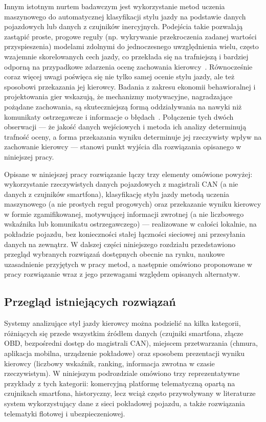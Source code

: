 Innym istotnym nurtem badawczym jest wykorzystanie metod uczenia maszynowego do
automatycznej klasyfikacji stylu jazdy na podstawie danych pojazdowych lub danych
z czujników inercyjnych. Podejścia takie pozwalają zastąpić proste, progowe reguły
(np. wykrywanie przekroczenia zadanej wartości przyspieszenia) modelami zdolnymi do
jednoczesnego uwzględnienia wielu, często wzajemnie skorelowanych cech jazdy, co
przekłada się na trafniejszą i bardziej odporną na przypadkowe zdarzenia ocenę
zachowania kierowcy~\cite{meiring2015}. Równocześnie coraz więcej uwagi poświęca się nie
tylko samej ocenie stylu jazdy, ale też sposobowi przekazania jej kierowcy. Badania
z zakresu ekonomii behawioralnej i projektowania gier wskazują, że mechanizmy
motywacyjne, nagradzające pożądane zachowania, są skuteczniejszą formą oddziaływania na
nawyki niż komunikaty ostrzegawcze i informacje o błędach~\cite{thaler2008,deterding2011}.
Połączenie tych dwóch obserwacji --- że jakość danych wejściowych i metoda ich analizy
determinują trafność oceny, a forma przekazania wyniku determinuje jej rzeczywisty
wpływ na zachowanie kierowcy --- stanowi punkt wyjścia dla rozwiązania opisanego
w niniejszej pracy.

Opisane w niniejszej pracy rozwiązanie łączy trzy elementy omówione powyżej:
wykorzystanie rzeczywistych danych pojazdowych z magistrali CAN (a nie danych
z czujników smartfona), klasyfikację stylu jazdy metodą uczenia maszynowego (a nie
prostych reguł progowych) oraz przekazanie wyniku kierowcy w formie zgamifikowanej,
motywującej informacji zwrotnej (a nie liczbowego wskaźnika lub komunikatu
ostrzegawczego) --- realizowane w całości lokalnie, na pokładzie pojazdu, bez
konieczności stałej łączności sieciowej ani przesyłania danych na zewnątrz. W dalszej
części niniejszego rozdziału przedstawiono przegląd wybranych rozwiązań dostępnych
obecnie na rynku, naukowe uzasadnienie przyjętych
w pracy metod, a następnie omówiono
proponowane w pracy rozwiązanie wraz z jego przewagami względem opisanych alternatyw.

\subsection{Przegląd istniejących rozwiązań}
\label{sec:przeglad}

Systemy analizujące styl jazdy kierowcy można podzielić na kilka kategorii, różniących
się przede wszystkim źródłem danych (czujniki smartfona, złącze OBD, bezpośredni dostęp
do magistrali CAN), miejscem przetwarzania (chmura, aplikacja mobilna, urządzenie
pokładowe) oraz sposobem prezentacji wyniku kierowcy (liczbowy wskaźnik, ranking,
informacja zwrotna w czasie rzeczywistym). W niniejszym podrozdziale omówiono trzy
reprezentatywne przykłady z tych kategorii: komercyjną platformę telematyczną opartą
na czujnikach smartfona, historyczny, lecz wciąż często przywoływany w literaturze
system wykorzystujący dane z sieci pokładowej pojazdu, a także rozwiązania telematyki
flotowej i ubezpieczeniowej.

